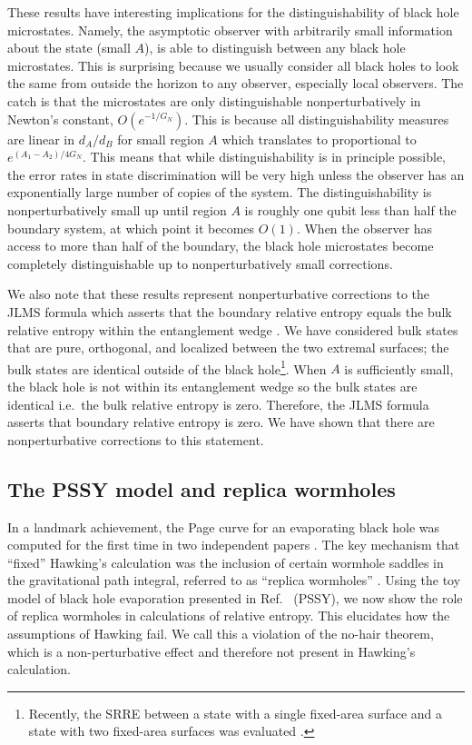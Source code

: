 \documentclass[a4paper,11pt]{article}
\begin{document}
These results have interesting implications for the distinguishability of black hole microstates. Namely, the asymptotic observer with arbitrarily small information about the state (small $A$), is able to distinguish between any black hole microstates. This is surprising because we usually consider all black holes to look the same from outside the horizon to any observer, especially local observers. The catch is that the microstates are only distinguishable nonperturbatively in Newton's constant, $O(e^{-1/G_N})$. This is because all distinguishability measures are linear in $d_A/d_B$ for small region $A$ which translates to proportional to $e^{(A_1-A_2)/4G_N}$. This means that while distinguishability is in principle possible, the error rates in state discrimination will be very high unless the observer has an exponentially large number of copies of the system. The distinguishability is nonperturbatively small up until region $A$ is roughly one qubit less than half the boundary system, at which point it becomes $O(1)$. When the observer has access to more than half of the boundary, the black hole microstates become completely distinguishable up to nonperturbatively small corrections.

We also note that these results represent nonperturbative corrections to the JLMS formula which asserts that the boundary relative entropy equals the bulk relative entropy within the entanglement wedge \cite{2016JHEP...06..004J}. We have considered bulk states that are pure, orthogonal, and localized between the two extremal surfaces; the bulk states are identical outside of the black hole\footnote{Recently, the SRRE between a state with a single fixed-area surface and a state with two fixed-area surfaces was evaluated \cite{2021arXiv210700009H}.}. When $A$ is sufficiently small, the black hole is not within its entanglement wedge so the bulk states are identical i.e.~the bulk relative entropy is zero. Therefore, the JLMS formula asserts that boundary relative entropy is zero. We have shown that there are nonperturbative corrections to this statement.


\subsection{The PSSY model and replica wormholes}

In a landmark achievement, the Page curve \cite{1993PhRvL..71.3743P} for an evaporating black hole was computed for the first time in two independent papers \cite{2020JHEP...09..002P,2019JHEP...12..063A}. The key mechanism that ``fixed'' Hawking's calculation was the inclusion of certain wormhole saddles in the gravitational path integral, referred to as ``replica wormholes'' \cite{2019arXiv191111977P,2020JHEP...05..013A}. Using the toy model of black hole evaporation presented in Ref.~\cite{2019arXiv191111977P} (PSSY), we now show the role of replica wormholes in calculations of relative entropy. This elucidates how the assumptions of Hawking fail. We call this a violation of the no-hair theorem, which is a non-perturbative effect and therefore not present in Hawking's calculation.
\end{document}
